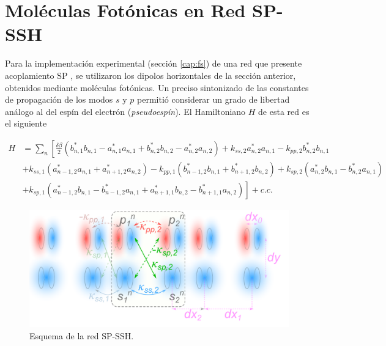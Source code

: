 \section{Moléculas Fotónicas en Red SP-SSH}

Para la implementación experimental (sección \ref{cap:fs}) de una red que presente acoplamiento SP \citep{interorbital, SPSSH}, se utilizaron los dipolos horizontales de la sección anterior, obtenidos mediante moléculas fotónicas. Un preciso sintonizado de las constantes de propagación de los modos $s$ y $p$ permitió considerar un grado de libertad análogo al del espín del electrón (\textit{pseudoespín}). El Hamiltoniano $H$ de esta red \citep{SPSSH,toporusos}  es el siguiente

\begin{align*}
	H &= \sum_n \left[\frac{\delta\beta}{2} \left( b^*_{n, 1} b_{n, 1} - a^*_{n, 1} a_{n, 1} + b^*_{n, 2} b_{n, 2} - a^*_{n, 2} a_{n, 2} \right) +k_{ss, 2}a^*_{n, 2} a_{n, 1} -k_{pp, 2}b^*_{n, 2} b_{n, 1} \right. 
	\\	
	&+ k_{ss, 1} \left( a_{n-1, 2}^*a_{n, 1} + a_{n+1, 2}^*a_{n, 2} \right) - k_{pp, 1} \left( b_{n-1, 2}^*b_{n, 1} + b_{n+1, 2}^*b_{n, 2} \right) + k_{sp, 2} \left( a_{n, 2}^* b_{n, 1} - b_{n, 2}^* a_{n, 1} \right)
	\\
	&+ \left. k_{sp, 1} \left( a_{n-1, 2}^* b_{n, 1} - b_{n-1, 2}^* a_{n, 1} + a_{n+1, 1}^*b_{n, 2} - b_{n+1, 1}^* a_{n, 2} \right) \right] + c.c.
\end{align*}

\begin{figure}[H]
\centering
	\includegraphics[width=0.7\linewidth]{media/ssh_sp_model}
	\caption{Esquema de la red SP-SSH.}
\end{figure}